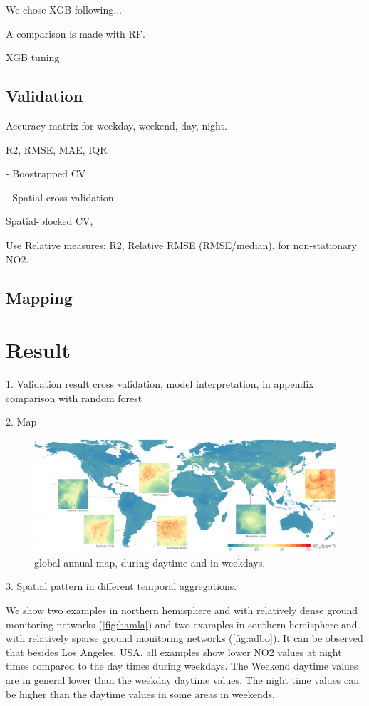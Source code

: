 \documentclass{article}
\begin{document}
We chose XGB following...

A comparison is made with RF. 

XGB tuning

\subsection{Validation}

Accuracy matrix for weekday, weekend, day, night.

R2, RMSE, MAE, IQR

- Boostrapped CV

- Spatial cross-validation

Spatial-blocked CV,

Use Relative measures: 
R2, Relative RMSE (RMSE/median), for non-stationary NO2. 



 

\subsection{Mapping} 

\section{Result}
1. Validation result
cross validation, model interpretation, in appendix comparison with random forest
                   
2. Map
\begin{figure}
    \centering
    \includegraphics[width=\textwidth]{fig/glomap.png}
    \caption{global annual map, during daytime and in weekdays.}
    \label{fig:map}
\end{figure}

3. Spatial pattern in different temporal aggregations.

We show two examples in northern hemisphere and with relatively dense ground monitoring networks (\cref{fig:hamla}) and two examples in southern hemisphere and with relatively sparse ground monitoring networks (\cref{fig:adbo}). It can be observed that besides Los Angeles, USA, all examples show lower NO2 values at night times compared to the day times during weekdays. The Weekend daytime values are in general lower than the weekday daytime values. The night time values can be higher than the daytime values in some areas in weekends.   
 
\end{document}
